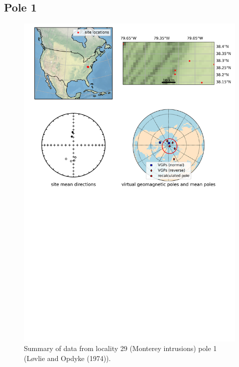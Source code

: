 \documentclass{article}
\begin{document}
\subsection{Pole 1}


\begin{figure}[H]
\centering
\includegraphics[width=5 in]{./29/1/pole_summary.png}
\caption{Summary of data from locality 29 (Monterey intrusions) pole 1 (Løvlie and Opdyke (1974)).}
\end{figure}
\end{document}

